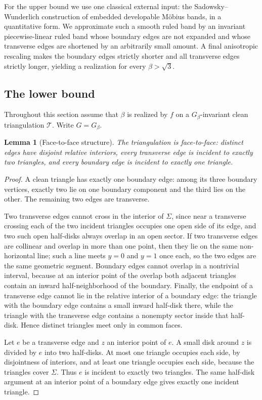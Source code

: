 \documentclass[12pt]{article}
\theoremstyle{plain}
\newtheorem{lemma}[theorem]{Lemma}
\begin{document}
For the upper bound we use one classical external input: the
Sadowsky--Wunderlich construction of embedded developable M\"obius bands, in a
quantitative form.  We approximate such a smooth ruled band by an invariant
piecewise-linear ruled band whose boundary edges are not expanded and whose
transverse edges are shortened by an arbitrarily small amount.  A final
anisotropic rescaling makes the boundary edges strictly shorter and all
transverse edges strictly longer, yielding a realization for every
\(\beta>\sqrt3\).

\subsection{The lower bound}

Throughout this section assume that \(\beta\) is realized by \(f\) on a
\(G_\beta\)-invariant clean triangulation \(\mathcal T\).  Write
\(G=G_\beta\).

\begin{lemma}[Face-to-face structure]\label{lem:facetoface}
The triangulation is face-to-face: distinct edges have disjoint relative
interiors, every transverse edge is incident to exactly two triangles, and
every boundary edge is incident to exactly one triangle.
\end{lemma}

\begin{proof}
A clean triangle has exactly one boundary edge: among its three boundary
vertices, exactly two lie on one boundary component and the third lies on the
other.  The remaining two edges are transverse.

Two transverse edges cannot cross in the interior of \(\Sigma\), since near a
transverse crossing each of the two incident triangles occupies one open side
of its edge, and two such open half-disks always overlap in an open sector.  If
two transverse edges are collinear and overlap in more than one point, then
they lie on the same non-horizontal line; such a line meets \(y=0\) and
\(y=1\) once each, so the two edges are the same geometric segment.  Boundary
edges cannot overlap in a nontrivial interval, because at an interior point of
the overlap both adjacent triangles contain an inward half-neighborhood of the
boundary.  Finally, the endpoint of a transverse edge cannot lie in the
relative interior of a boundary edge: the triangle with the boundary edge
contains a small inward half-disk there, while the triangle with the transverse
edge contains a nonempty sector inside that half-disk.  Hence distinct
triangles meet only in common faces.

Let \(e\) be a transverse edge and \(z\) an interior point of \(e\).  A small
disk around \(z\) is divided by \(e\) into two half-disks.  At most one
triangle occupies each side, by disjointness of interiors, and at least one
triangle occupies each side, because the triangles cover \(\Sigma\).  Thus
\(e\) is incident to exactly two triangles.  The same half-disk argument at an
interior point of a boundary edge gives exactly one incident triangle.
\end{proof}
\end{document}
